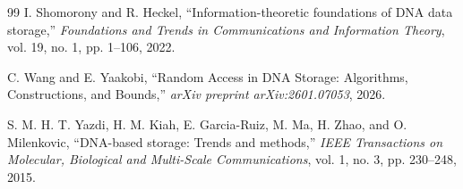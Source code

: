 \documentclass[11pt,a4paper]{article}
\numberwithin{equation}{section}
\theoremstyle{definition}
\theoremstyle{definition}
\begin{document}
\begin{thebibliography}{99}
I. Shomorony and R. Heckel,
``Information-theoretic foundations of DNA data storage,''
\emph{Foundations and Trends in Communications and Information Theory},
vol. 19, no. 1, pp. 1--106, 2022.

C. Wang and E. Yaakobi,
``Random Access in DNA Storage: Algorithms, Constructions, and Bounds,''
\emph{arXiv preprint arXiv:2601.07053}, 2026.

S. M. H. T. Yazdi, H. M. Kiah, E. Garcia-Ruiz, M. Ma, H. Zhao,
and O. Milenkovic,
``DNA-based storage: Trends and methods,''
\emph{IEEE Transactions on Molecular, Biological and Multi-Scale Communications},
vol. 1, no. 3, pp. 230--248, 2015.



\end{thebibliography}
\end{document}
